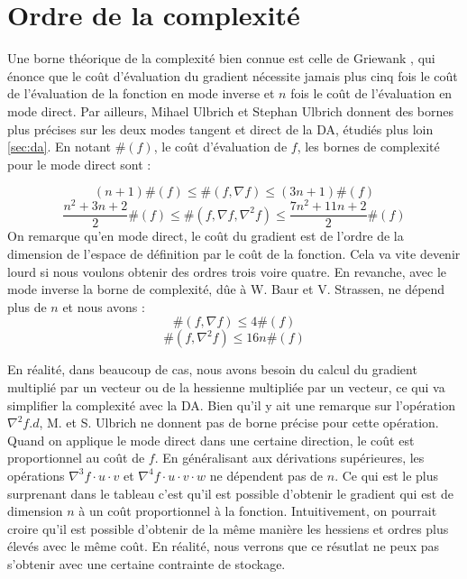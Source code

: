 \section{Ordre de la complexit\'e}
\label{chap1:ordre}
Une borne th\'eorique de la complexit\'e bien connue est celle de Griewank \cite{Iri89onautomatic}, qui \'enonce que
le coût d'\'evaluation du gradient n\'ecessite jamais plus cinq fois le coût de l'\'evaluation
de la fonction en mode inverse et $n$ fois le coût de l'\'evaluation en mode direct.
Par ailleurs, Mihael Ulbrich et Stephan Ulbrich \cite{Ulbrich} donnent des bornes plus pr\'ecises sur les deux modes tangent et direct
de la DA, \'etudi\'es plus loin \ref{sec:da}.
En notant $\#(f)$, le coût d'\'evaluation de $f$, les bornes de complexit\'e pour le mode direct sont :

$$(n+1)\#(f) \leq \#(f,\nabla f)\leq (3n+1)\#(f)$$
$$\frac{n^2+3n+2}{2}\#(f) \leq \#(f,\nabla f,\nabla^2f)\leq \frac{7n^2+11n+2}{2}\#(f)$$
%
On remarque qu'en mode direct, le coût du gradient est de l'ordre de la dimension de l'espace de d\'efinition par le coût de la fonction.
Cela va vite devenir lourd si nous voulons obtenir des ordres trois voire quatre.
En revanche, avec le mode inverse la borne de complexit\'e, dûe \`a W. Baur et V. Strassen\cite{Baur}, ne d\'epend plus de $n$ et nous avons :
\begin{equation*}
\#(f,\nabla f)\leq 4\#(f)
\end{equation*}
\begin{equation*}
\#(f,\nabla^2 f)\leq 16n\#(f)
\end{equation*}


En r\'ealit\'e, dans beaucoup de cas, nous avons besoin du calcul du gradient multipli\'e par un vecteur ou de la hessienne multipli\'ee par un vecteur, ce qui va simplifier la
complexit\'e avec la DA.
Bien qu'il y ait une remarque sur l'op\'eration $\nabla^2 f.d $, M. et S. Ulbrich ne donnent pas de borne pr\'ecise pour cette op\'eration.
Quand on applique le mode direct dans une certaine direction, le coût est proportionnel au coût de $f$. En g\'en\'eralisant aux d\'erivations
sup\'erieures, les op\'erations $\nabla^3 f\cdot u \cdot v$ et $\nabla^4 f\cdot u \cdot v \cdot w$ ne d\'ependent pas de $n$. Ce qui est
le plus surprenant dans le tableau c'est qu'il est possible d'obtenir le gradient qui est de dimension $n$ \`a un coût proportionnel \`a
la fonction. Intuitivement, on pourrait croire qu'il est possible d'obtenir de la même mani\`ere les hessiens et ordres plus \'elev\'es avec
le même coût. En r\'ealit\'e, nous verrons que ce r\'esutlat ne peux pas s'obtenir avec une certaine contrainte de stockage.

